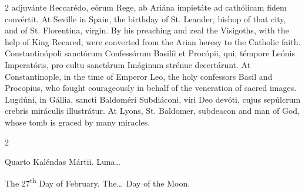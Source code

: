 \begin{paracol}{2}
 adjuvánte Reccarédo, eórum Rege, ab Ariána impietáte ad cathólicam fidem 
 convértit.
\switchcolumn
{}
At Seville in Spain, the birthday of St. Leander, bishop of that city, and 
 of St. Florentina, virgin. By his preaching and zeal the Visigoths, 
 with the help of King Recared, were converted from the Arian heresy to the 
 Catholic faith.
\switchcolumn*
{}
Constantinópoli sanctórum Confessórum Basilíi 
 et Procópii, qui, témpore Leónis Imperatóris, pro cultu sanctárum Imáginum 
 strénue decertárunt.
\switchcolumn
{}
At Constantinople, in the time of Emperor Leo, the holy confessors Basil and 
 Procopius, who fought courageously in behalf of the veneration of sacred 
 images.
\switchcolumn*
{}
Lugdúni, in Gállia, sancti Baldoméri Subdiáconi, viri Deo devóti, cujus 
 sepúlcrum crebris miráculis illustrátur.
\switchcolumn
{}
At Lyons, St. Baldomer, subdeacon and man of God, whose tomb is graced by 
 many miracles.
\switchcolumn*
{}
\end{paracol}


\begin{paracol}{2}
\begin{center}{\color{gregoriocolor} Quarto Kaléndas Mártii. 
 Luna\dots\ }\end{center}
\switchcolumn
{}
\begin{center}{\color{gregoriocolor} The 27\textsuperscript{th} Day of February. The\dots\ Day of the Moon.}\end{center}
\end{paracol}

